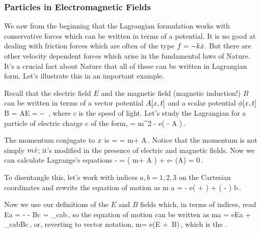 \subsubsection{Particles in Electromagnetic Fields}
We saw from the beginning that the Lagrangian formulation works with conservative forces which can be written in terms of a potential. It is no good at dealing with friction forces which are often of the type $f = -k\dot{x}$. But there are other velocity dependent forces which arise in the fundamental laws of Nature. It's a crucial fact about Nature that all of these can be written in Lagrangian form. Let's illustrate this in an important example.

Recall that the electric field $E$ and the magnetic field (magnetic induction!) $B$ can be written in terms of a vector potential $A\!\left[{x,t}\right]$ and a scalar potential $\phi\!\left[{x,t}\right]$
\beq
B = \gder\cprod A\qquad{}\qquad E = -\gder\phi - \,,
\eeq
where $c$ is the speed of light. Let's study the Lagrangian for a particle of electric charge $e$ of the form,
\beq
\lag = m\dt\pvec^2 - e\left( \phi - \dt\pvec\iprod A \right)\,.
\eeq

The momentum conjugate to $x$ is
\beq
\lmom = \xpd{\lag}{\dt\pvec} = m\dt\pvec + A\,.
\eeq
Notice that the momentum is not simply $m\dot{x}$; it's modified in the presence of electric and magnetic fields. Now we can calculate Lagrange's equations
\beq
{}\xpd{\lag}{\dt\pvec} - \xpd{\lag}{\pvec} = \left( m\dt\pvec + A \right)
    + e\gder\phi - \gder\left(\dt\pvec\iprod A\right) = 0\,.
\eeq

To disentangle this, let's work with indices $a, b = 1, 2, 3$ on the Cartesian coordinates and rewrite the equation of motion as
\beq
m\ivec{\ddt\pvec} a = - e\left(  +  \right) 
                      + \left(  -  \right)\ivec{\dt\pvec} b\,.
\eeq

Now we use our definitions of the $E$ and $B$ fields which, in terms of indices, read
\beq
\covec Ea = - - \qquad \covec Bc = \lct_{cab}\,,
\eeq
so the equation of motion can be written as
\beq
m\ivec{\ddt\pvec}a = e\covec Ea + \,\lct_{cab}\covec Bc\,,
\eeq
or, reverting to vector notation,
\beq
m\ddt\pvec = e\left(E + \,\dt\pvec\cprod B\right)\,,
\eeq
which is the .

